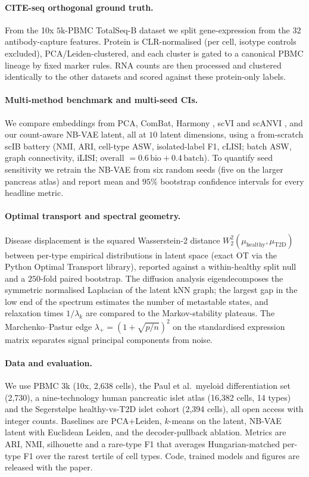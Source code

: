 \documentclass[11pt]{article}
\begin{document}
\paragraph{CITE-seq orthogonal ground truth.} From the 10x $5$k-PBMC TotalSeq-B dataset
\citep{stoeckius2017citeseq} we split gene-expression from the $32$ antibody-capture features. Protein
is CLR-normalised (per cell, isotype controls excluded), PCA/Leiden-clustered, and each cluster is
gated to a canonical PBMC lineage by fixed marker rules. RNA counts are then processed and clustered
identically to the other datasets and scored against these protein-only labels.

\paragraph{Multi-method benchmark and multi-seed CIs.} We compare embeddings from PCA, ComBat, Harmony
\citep{korsunsky2019harmony}, scVI and scANVI \citep{lopez2018scvi,gayoso2022scvitools}, and our
count-aware NB-VAE latent, all at $10$ latent dimensions, using a from-scratch scIB battery
\citep{luecken2022benchmarking} (NMI, ARI, cell-type ASW, isolated-label F1, cLISI; batch ASW, graph
connectivity, iLISI; overall $=0.6\,\mathrm{bio}+0.4\,\mathrm{batch}$). To quantify seed sensitivity we
retrain the NB-VAE from six random seeds (five on the larger pancreas atlas) and report mean and $95\%$
bootstrap confidence intervals for every headline metric.

\paragraph{Optimal transport and spectral geometry.} Disease displacement is the squared
Wasserstein-2 distance $W_2^2(\mu_{\text{healthy}},\mu_{\text{T2D}})$ between per-type empirical
distributions in latent space (exact OT via the Python Optimal Transport library), reported against a
within-healthy split null and a $250$-fold paired bootstrap. The diffusion analysis eigendecomposes the
symmetric normalised Laplacian of the latent kNN graph; the largest gap in the low end of the spectrum
estimates the number of metastable states, and relaxation times $1/\lambda_k$ are compared to the
Markov-stability plateaus. The Marchenko--Pastur edge $\lambda_+=(1+\sqrt{p/n})^2$ on the
standardised expression matrix separates signal principal components from noise.

\paragraph{Data and evaluation.} We use PBMC 3k (10x, 2{,}638 cells), the Paul et al.\ myeloid
differentiation set (2{,}730), a nine-technology human pancreatic islet atlas (16{,}382 cells, 14
types) and the Segerst{\o}lpe healthy-vs-T2D islet cohort (2{,}394 cells), all open access with integer
counts. Baselines are PCA+Leiden, $k$-means on the latent, NB-VAE latent with Euclidean Leiden, and the
decoder-pullback ablation. Metrics are ARI, NMI, silhouette and a rare-type F1 that averages
Hungarian-matched per-type F1 over the rarest tertile of cell types. Code, trained models and figures
are released with the paper.
\end{document}
